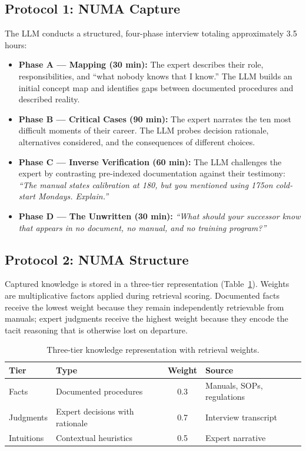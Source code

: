 \documentclass[11pt,a4paper]{article}
\begin{document}
\subsection{Protocol 1: NUMA Capture}

The LLM conducts a structured, four-phase interview totaling approximately 3.5 hours:

\begin{itemize}
\item \textbf{Phase A --- Mapping (30 min):}
The expert describes their role, responsibilities, and ``what nobody knows that I know.'' The LLM builds an initial concept map and identifies gaps between documented procedures and described reality.

\item \textbf{Phase B --- Critical Cases (90 min):}
The expert narrates the ten most difficult moments of their career. The LLM probes decision rationale, alternatives considered, and the consequences of different choices.

\item \textbf{Phase C --- Inverse Verification (60 min):}
The LLM challenges the expert by contrasting pre-indexed documentation against their testimony: {\it ``The manual states calibration at 180\textdegree, but you mentioned using 175\textdegree on cold-start Mondays. Explain.''}

\item \textbf{Phase D --- The Unwritten (30 min):}
{\it ``What should your successor know that appears in no document, no manual, and no training program?''}
\end{itemize}

\subsection{Protocol 2: NUMA Structure}

Captured knowledge is stored in a three-tier representation (Table~\ref{tab:tiers}). Weights are multiplicative factors applied during retrieval scoring. Documented facts receive the lowest weight because they remain independently retrievable from manuals; expert judgments receive the highest weight because they encode the tacit reasoning that is otherwise lost on departure.

\begin{table}[ht]
\centering
\caption{Three-tier knowledge representation with retrieval weights.}
\label{tab:tiers}
\begin{tabular}{llcl}
\hline
\textbf{Tier} & \textbf{Type} & \textbf{Weight} & \textbf{Source} \\
\hline
Facts & Documented procedures & 0.3 & Manuals, SOPs, regulations \\
Judgments & Expert decisions with rationale & 0.7 & Interview transcript \\
Intuitions & Contextual heuristics & 0.5 & Expert narrative \\
\hline
\end{tabular}
\end{table}
\end{document}
